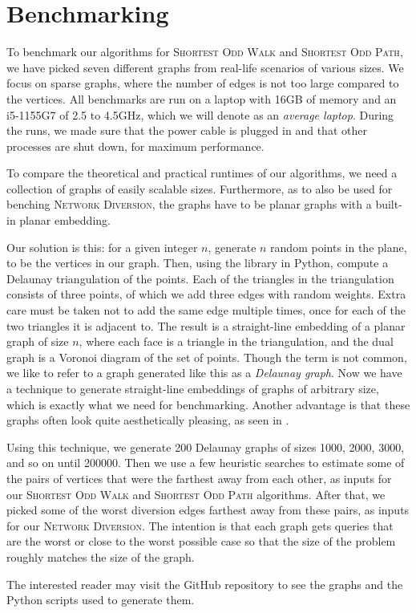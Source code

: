\section{Benchmarking}
\label{section:benchmarking}
To benchmark our algorithms for \textsc{Shortest Odd Walk} and \textsc{Shortest Odd Path}, we have picked seven different graphs from real-life scenarios of various sizes. We focus on sparse graphs, where the number of edges is not too large compared to the vertices. All benchmarks are run on a laptop with 16GB of memory and an i5-1155G7 of 2.5 to 4.5GHz, which we will denote as an \emph{average laptop}. During the runs, we made sure that the power cable is plugged in and that other processes are shut down, for maximum performance.

To compare the theoretical and practical runtimes of our algorithms, we need a collection of graphs of easily scalable sizes. Furthermore, as to also be used for benching \textsc{Network Diversion}, the graphs have to be planar graphs with a built-in planar embedding.

Our solution is this: for a given integer $n$, generate $n$ random points in the plane, to be the vertices in our graph. Then, using the  library in Python, compute a Delaunay triangulation of the points. Each of the triangles in the triangulation consists of three points, of which we add three edges with random weights. Extra care must be taken not to add the same edge multiple times, once for each of the two triangles it is adjacent to. The result is a straight-line embedding of a planar graph of size $n$, where each face is a triangle in the triangulation, and the dual graph is a Voronoi diagram of the set of points. Though the term is not common, we like to refer to a graph generated like this as a \emph{Delaunay graph}. Now we have a technique to generate straight-line embeddings of graphs of arbitrary size, which is exactly what we need for benchmarking. Another advantage is that these graphs often look quite aesthetically pleasing, as seen in .

Using this technique, we generate 200 Delaunay graphs of sizes 1000, 2000, 3000, and so on until 200000. Then we use a few heuristic searches to estimate some of the pairs of vertices that were the farthest away from each other, as inputs for our \textsc{Shortest Odd Walk} and \textsc{Shortest Odd Path} algorithms. After that, we picked some of the worst diversion edges farthest away from these pairs, as inputs for our \textsc{Network Diversion}. The intention is that each graph gets queries that are the worst or close to the worst possible case so that the size of the problem roughly matches the size of the graph.

The interested reader may visit the GitHub repository \cite{source:codebase} to see the graphs and the Python scripts used to generate them.
